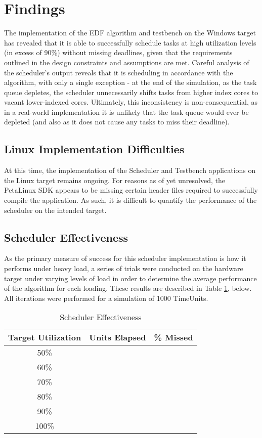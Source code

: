 
\section{Findings}\label{sec:findings}
The implementation of the EDF algorithm and testbench on the Windows target has revealed that it is able to successfully schedule tasks at high utilization levels (in excess of 90\%) without missing deadlines, given that the requirements outlined in the design constraints and assumptions are met. Careful analysis of the scheduler's output reveals that it is scheduling in accordance with the algorithm, with only a single exception - at the end of the simulation, as the task queue depletes, the scheduler unnecessarily shifts tasks from higher index cores to vacant lower-indexed cores. Ultimately, this inconsistency is non-consequential, as in a real-world implementation it is unlikely that the task queue would ever be depleted (and also as it does not cause any tasks to miss their deadline).

\subsection{Linux Implementation Difficulties}\label{linuxImplDifficulties}
At this time, the implementation of the Scheduler and Testbench applications on the Linux target remains ongoing. For reasons as of yet unresolved, the PetaLinux SDK appears to be missing certain header files required to successfully compile the application. As such, it is difficult to quantify the performance of the scheduler on the intended target.

\subsection{Scheduler Effectiveness}\label{schedulerData}
As the primary measure of success for this scheduler implementation is how it performs under heavy load, a series of trials were conducted on the hardware target under varying levels of load in order to determine the average performance of the algorithm for each loading. These results are described in Table \ref{table:1}, below. All iterations were performed for a simulation of 1000 TimeUnits.

\begin{table}[h!]
    \centering\begin{tabular}{| c | c | c |}
        \hline
        Target Utilization & Units Elapsed & \% Missed \\
        \hline
        50\% & & \\
        60\% & & \\
        70\% & & \\
        80\% & & \\
        90\% & & \\
        100\% & & \\
        \hline
    \end{tabular}
    \caption{Scheduler Effectiveness}
    \label{table:1}
\end{table}

